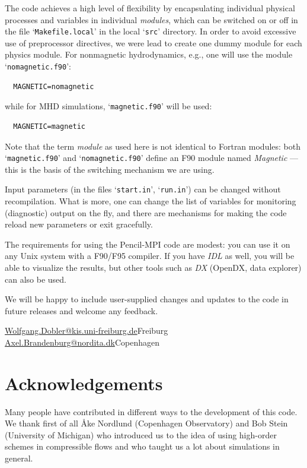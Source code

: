 \documentclass[12pt,twoside,notitlepage,a4paper]{article}
\newcommand{\file}[1]{`\texttt{#1}'}
\newcommand{\name}[1]{\textsl{#1}\index{#1}\/}
\begin{document}
The code achieves a high level of flexibility by encapsulating individual
physical processes and variables in individual \name{modules}, which can
be switched on or off in the file \file{Makefile.local} in the local
\file{src} directory.
In order to avoid excessive use of preprocessor directives, we were lead
to create one dummy module for each physics module.
For nonmagnetic hydrodynamics, e.g., one will use the module
\file{nomagnetic.f90}:
\begin{Verbatim}
  MAGNETIC=nomagnetic
\end{Verbatim}
while for MHD simulations, \file{magnetic.f90} will be used:
\begin{Verbatim}
  MAGNETIC=magnetic
\end{Verbatim}
Note that the term \name{module} as used here is not identical to Fortran
modules: both \file{magnetic.f90} and \file{nomagnetic.f90} define an F90
module named \emph{Magnetic} --- this is the basis of the switching
mechanism we are using.

Input parameters (in the files \file{start.in}, \file{run.in}) can be
changed without recompilation.
What is more, one can change the list of variables for monitoring
(diagnostic) output on the fly, and there are mechanisms for making the
code reload new parameters or exit gracefully.

The requirements for using the Pencil-MPI code are modest: you can use it
on any Unix system with a F90/F95 compiler. If you have \name{IDL} as
well, you will be able to visualize the results, but other tools such as
\name{DX} (OpenDX, data explorer) can also be used.

\bigskip

We will be happy to include user-supplied changes and updates to the code
in future releases and welcome any feedback.

\vspace{5mm}
\url{Wolfgang.Dobler@kis.uni-freiburg.de}\hfill Freiburg\\
\url{Axel.Brandenburg@nordita.dk}\hfill Copenhagen

\section*{Acknowledgements}

Many people have contributed in different ways to the development of this
code. We thank first of all {\AA}ke Nordlund (Copenhagen Observatory)
and Bob Stein (University of Michigan) who introduced us to the idea of
using high-order schemes in compressible flows and who taught us a lot
about simulations in general.
\end{document}
